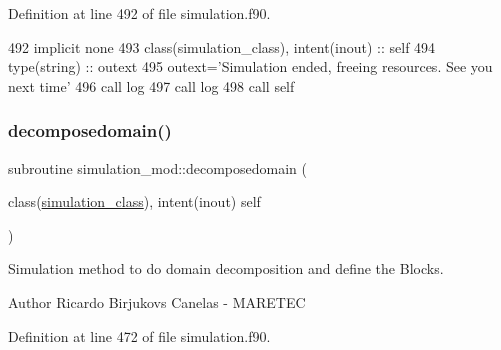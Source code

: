Definition at line 492 of file simulation.\+f90.


\begin{DoxyCode}
492     \textcolor{keywordtype}{implicit none}
493     \textcolor{keywordtype}{class}(simulation\_class), \textcolor{keywordtype}{intent(inout)} :: self
494     \textcolor{keywordtype}{type}(string) :: outext
495     outext=\textcolor{stringliteral}{'Simulation ended, freeing resources. See you next time'}
496     \textcolor{keyword}{call }log%
497     \textcolor{keyword}{call }log%
498     \textcolor{keyword}{call }self%
\end{DoxyCode}
\mbox{\label{namespacesimulation__mod_a2b8198a9fb3f7671c6b45192a0b9740c}} 
\subsubsection{\texorpdfstring{decomposedomain()}{decomposedomain()}}
{\footnotesize\ttfamily subroutine simulation\+\_\+mod\+::decomposedomain (\begin{DoxyParamCaption}\item[{class(\mbox{\hyperlink{structsimulation__mod_1_1simulation__class}{simulation\+\_\+class}}), intent(inout)}]{self }\end{DoxyParamCaption})\hspace{0.3cm}{\ttfamily [private]}}



Simulation method to do domain decomposition and define the Blocks. 

\begin{DoxyAuthor}{Author}
Ricardo Birjukovs Canelas -\/ M\+A\+R\+E\+T\+EC 
\end{DoxyAuthor}


Definition at line 472 of file simulation.\+f90.


